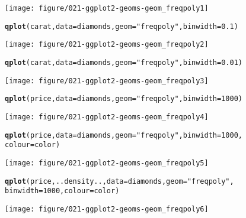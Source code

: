 \documentclass[a4paper,titlepage]{tufte-handout}\usepackage[]{graphicx}\usepackage[]{color}
\makeatletter
\def\maxwidth{ %
  \ifdim\Gin@nat@width>\linewidth
    \linewidth
  \else
    \Gin@nat@width
  \fi
}
\newcommand{\hlnum}[1]{\textcolor[rgb]{0.686,0.059,0.569}{#1}}%
\newcommand{\hlstr}[1]{\textcolor[rgb]{0.192,0.494,0.8}{#1}}%
\newcommand{\hlstd}[1]{\textcolor[rgb]{0.345,0.345,0.345}{#1}}%
\newcommand{\hlkwc}[1]{\textcolor[rgb]{0.333,0.667,0.333}{#1}}%
\newcommand{\hlkwd}[1]{\textcolor[rgb]{0.737,0.353,0.396}{\textbf{#1}}}%
\newenvironment{kframe}{%
 \def\at@end@of@kframe{}%
 \ifinner\ifhmode%
  \def\at@end@of@kframe{\end{minipage}}%
  \begin{minipage}{\columnwidth}%
 \fi\fi%
 \def\FrameCommand##1{\hskip\@totalleftmargin \hskip-\fboxsep
 \colorbox{shadecolor}{##1}\hskip-\fboxsep
     \hskip-\linewidth \hskip-\@totalleftmargin \hskip\columnwidth}%
 \MakeFramed {\advance\hsize-\width
   \@totalleftmargin\z@ \linewidth\hsize
   \@setminipage}}%
 {\par\unskip\endMakeFramed%
 \at@end@of@kframe}
\newenvironment{knitrout}{}{} %
\makeatother
\begin{document}
\begin{knitrout}
\begin{kframe}
{\ttfamily\noindent\itshape\color{messagecolor}{\#\# stat\_bin: binwidth defaulted to range/30. Use 'binwidth = x' to adjust this.}}\end{kframe}
\texttt{[image: figure/021-ggplot2-geoms-geom\_freqpoly1]} 
\begin{kframe}\begin{alltt}
\hlkwd{qplot}\hlstd{(carat,} \hlkwc{data} \hlstd{= diamonds,} \hlkwc{geom} \hlstd{=} \hlstr{"freqpoly"}\hlstd{,} \hlkwc{binwidth} \hlstd{=} \hlnum{0.1}\hlstd{)}
\end{alltt}
\end{kframe}
\texttt{[image: figure/021-ggplot2-geoms-geom\_freqpoly2]} 
\begin{kframe}\begin{alltt}
\hlkwd{qplot}\hlstd{(carat,} \hlkwc{data} \hlstd{= diamonds,} \hlkwc{geom} \hlstd{=} \hlstr{"freqpoly"}\hlstd{,} \hlkwc{binwidth} \hlstd{=} \hlnum{0.01}\hlstd{)}
\end{alltt}
\end{kframe}
\texttt{[image: figure/021-ggplot2-geoms-geom\_freqpoly3]} 
\begin{kframe}\begin{alltt}
\hlkwd{qplot}\hlstd{(price,} \hlkwc{data} \hlstd{= diamonds,} \hlkwc{geom} \hlstd{=} \hlstr{"freqpoly"}\hlstd{,} \hlkwc{binwidth} \hlstd{=} \hlnum{1000}\hlstd{)}
\end{alltt}
\end{kframe}
\texttt{[image: figure/021-ggplot2-geoms-geom\_freqpoly4]} 
\begin{kframe}\begin{alltt}
\hlkwd{qplot}\hlstd{(price,} \hlkwc{data} \hlstd{= diamonds,} \hlkwc{geom} \hlstd{=} \hlstr{"freqpoly"}\hlstd{,} \hlkwc{binwidth} \hlstd{=} \hlnum{1000}\hlstd{,}
  \hlkwc{colour} \hlstd{= color)}
\end{alltt}
\end{kframe}
\texttt{[image: figure/021-ggplot2-geoms-geom\_freqpoly5]} 
\begin{kframe}\begin{alltt}
\hlkwd{qplot}\hlstd{(price, ..density..,} \hlkwc{data} \hlstd{= diamonds,} \hlkwc{geom} \hlstd{=} \hlstr{"freqpoly"}\hlstd{,}
  \hlkwc{binwidth} \hlstd{=} \hlnum{1000}\hlstd{,} \hlkwc{colour} \hlstd{= color)}
\end{alltt}
\end{kframe}
\texttt{[image: figure/021-ggplot2-geoms-geom\_freqpoly6]} 
\begin{kframe}\begin{alltt}


\end{alltt}
\end{kframe}
\end{knitrout}
\end{document}
